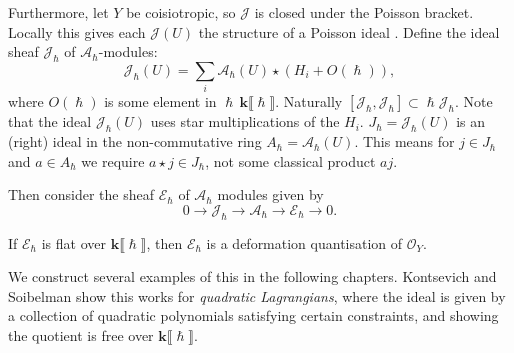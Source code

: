     Furthermore, let \(Y\) be coisiotropic, so \( \mathcal{J}\) is closed under the Poisson bracket. Locally this gives each \( \mathcal{J}(U)\) the structure of a Poisson ideal \cite{jordan}. Define the ideal sheaf \( \mathcal{J}_{\hslash}\) of \( \mathcal{A}_{\hslash}\)-modules:
    \[ \mathcal{J}_{\hslash}(U) = \sum_i \mathcal{A}_{\hslash}(U) \star  (H_i + O(\hslash)), \]
    where \( O(\hslash) \) is some element in \( \hslash \, \mathbf{k} \lBrack \hslash \rBrack\).
    Naturally \( [  \mathcal{J}_{\hslash} ,  \mathcal{J}_{\hslash}] \subset  \hslash \mathcal{J}_{\hslash}\).
    Note that the ideal \( \mathcal{J}_{\hslash}(U)\) uses star multiplications of the \(H_i\). \(J_{\hslash}= \mathcal{J}_{\hslash}(U)\) is an (right) ideal in the non-commutative ring \( A_{\hslash} = \mathcal{A}_{\hslash}(U)\). This means for \( j \in J_{\hslash} \) and \( a \in A_{\hslash}\) we require \( a \star j \in J_{\hslash}\), not some classical product \(a  j\). 
    
    Then consider the sheaf \( \mathcal{E}_{\hslash}\) of \( \mathcal{A}_{\hslash}\) modules  given by 
    \[ 0 \rightarrow \mathcal{J}_\hslash  \rightarrow \mathcal{A}_\hslash  \rightarrow \mathcal{E}_\hslash \rightarrow 0.\]
    \begin{prop} 
    If \(\mathcal{E}_\hslash\) is flat over \( \mathbf{k} \lBrack \hslash \rBrack\), then \( \mathcal{E}_\hslash\) is a deformation quantisation of \(\mathcal{O}_Y\).
    \end{prop}
    
    We construct several examples of this in the following chapters.  Kontsevich and Soibelman \cite{ks_airy} show this works for \emph{quadratic Lagrangians}, where the ideal is given by a collection of quadratic polynomials satisfying certain constraints, and showing the quotient is free over \( \mathbf{k} \lBrack \hslash \rBrack\).
    
    
